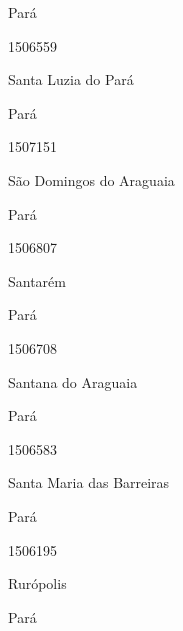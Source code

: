 \documentclass[
  letterpaper,
]{report}
\begin{document}
\n    

\n    

\n      

Pará

\n      

1506559

\n      

Santa Luzia do Pará

\n    

\n    

\n      

Pará

\n      

1507151

\n      

São Domingos do Araguaia

\n    

\n    

\n      

Pará

\n      

1506807

\n      

Santarém

\n    

\n    

\n      

Pará

\n      

1506708

\n      

Santana do Araguaia

\n    

\n    

\n      

Pará

\n      

1506583

\n      

Santa Maria das Barreiras

\n    

\n    

\n      

Pará

\n      

1506195

\n      

Rurópolis

\n    

\n    

\n      

Pará

\n      
\end{document}
